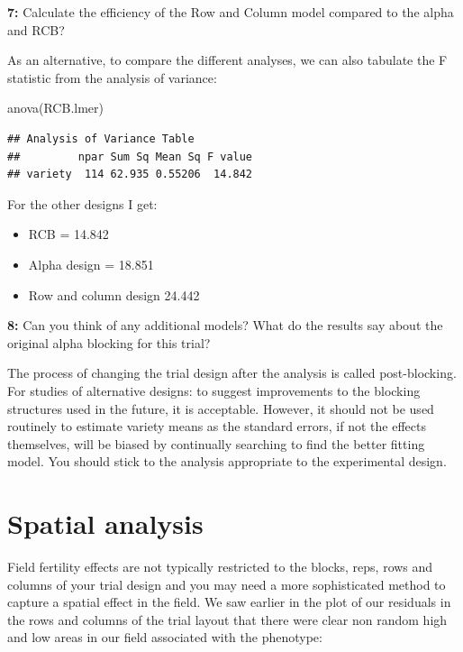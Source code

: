 \documentclass[
]{book}
\makeatletter
\newenvironment{Shaded}{\begin{snugshade}}{\end{snugshade}}
\newcommand{\FunctionTok}[1]{\textcolor[rgb]{0.00,0.00,0.00}{#1}}
\newcommand{\NormalTok}[1]{#1}
\providecommand{\tightlist}{%
  \setlength{\itemsep}{0pt}\setlength{\parskip}{0pt}}
\newenvironment{kframe}{%
\medskip{}
\setlength{\fboxsep}{.8em}
 \def\at@end@of@kframe{}%
 \ifinner\ifhmode%
  \def\at@end@of@kframe{\end{minipage}}%
  \begin{minipage}{\columnwidth}%
 \fi\fi%
 \def\FrameCommand##1{\hskip\@totalleftmargin \hskip-\fboxsep
 \colorbox{shadecolor}{##1}\hskip-\fboxsep
     \hskip-\linewidth \hskip-\@totalleftmargin \hskip\columnwidth}%
 \MakeFramed {\advance\hsize-\width
   \@totalleftmargin\z@ \linewidth\hsize
   \@setminipage}}%
 {\par\unskip\endMakeFramed%
 \at@end@of@kframe}
\newenvironment{rmdblock}[1]
  {
  \begin{itemize}
  \renewcommand{\labelitemi}{
    \raisebox{-.7\height}[0pt][0pt]{
      {\setkeys{Gin}{width=3em,keepaspectratio}\texttt{[image: images/\#1]}}
    }
  }
  \setlength{\fboxsep}{1em}
  \begin{kframe}
  \item
  }
  {
  \end{kframe}
  \end{itemize}
  }
\newenvironment{rmdquiz}
  {\begin{rmdblock}{quiz}}
  {\end{rmdblock}}
\makeatother
\begin{document}
\begin{rmdquiz}
\textbf{7:}
Calculate the efficiency of the Row and Column model compared to the alpha and RCB?
\end{rmdquiz}

As an alternative, to compare the different analyses, we can also tabulate the F statistic from the analysis of variance:

\begin{Shaded}
\begin{Highlighting}[]
\FunctionTok{anova}\NormalTok{(RCB.lmer)}
\end{Highlighting}
\end{Shaded}

\begin{verbatim}
## Analysis of Variance Table
##         npar Sum Sq Mean Sq F value
## variety  114 62.935 0.55206  14.842
\end{verbatim}

For the other designs I get:

\begin{itemize}
\tightlist
\item
  RCB = 14.842
\item
  Alpha design = 18.851
\item
  Row and column design 24.442
\end{itemize}

\begin{rmdquiz}
\textbf{8:}
Can you think of any additional models? What do the results say about the original alpha blocking for this trial?
\end{rmdquiz}

The process of changing the trial design after the analysis is called post-blocking. For studies of alternative designs: to suggest improvements to the blocking structures used in the future, it is acceptable. However, it should not be used routinely to estimate variety means as the standard errors, if not the effects themselves, will be biased by continually searching to find the better fitting model. You should stick to the analysis appropriate to the experimental design.

\hypertarget{spatial-analysis}{%
\section{Spatial analysis}\label{spatial-analysis}}

Field fertility effects are not typically restricted to the blocks, reps, rows and columns of your trial design and you may need a more sophisticated method to capture a spatial effect in the field. We saw earlier in the plot of our residuals in the rows and columns of the trial layout that there were clear non random high and low areas in our field associated with the phenotype:
\end{document}
